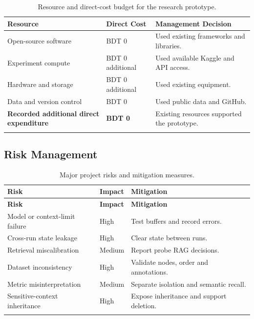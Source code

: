 \begin{table}[H]
\centering
\caption{Resource and direct-cost budget for the research prototype.}
\label{tab:annexA_budget}
\small
\begin{tabular}{p{}p{}p{}}
\toprule
\textbf{Resource} & \textbf{Direct Cost} & \textbf{Management Decision} \\
\midrule
Open-source software & BDT 0 & Used existing frameworks and libraries. \\
Experiment compute & BDT 0 additional & Used available Kaggle and API access. \\
Hardware and storage & BDT 0 additional & Used existing equipment. \\
Data and version control & BDT 0 & Used public data and GitHub. \\
\midrule
\textbf{Recorded additional direct expenditure} & \textbf{BDT 0} & Existing resources supported the prototype. \\
\botrule
\end{tabular}
\end{table}

\subsection{Risk Management}
\begin{longtable}{p{}p{}p{}}
\caption{Major project risks and mitigation measures.}\label{tab:annexA_risks}\\
\toprule
\textbf{Risk} & \textbf{Impact} & \textbf{Mitigation} \\
\midrule
\endfirsthead
\toprule
\textbf{Risk} & \textbf{Impact} & \textbf{Mitigation} \\
\midrule
\endhead
Model or context-limit failure & High & Test buffers and record errors. \\
Cross-run state leakage & High & Clear state between runs. \\
Retrieval miscalibration & Medium & Report probe RAG decisions. \\
Dataset inconsistency & High & Validate nodes, order and annotations. \\
Metric misinterpretation & Medium & Separate isolation and semantic recall. \\
Sensitive-context inheritance & High & Expose inheritance and support deletion. \\
\botrule
\end{longtable}

